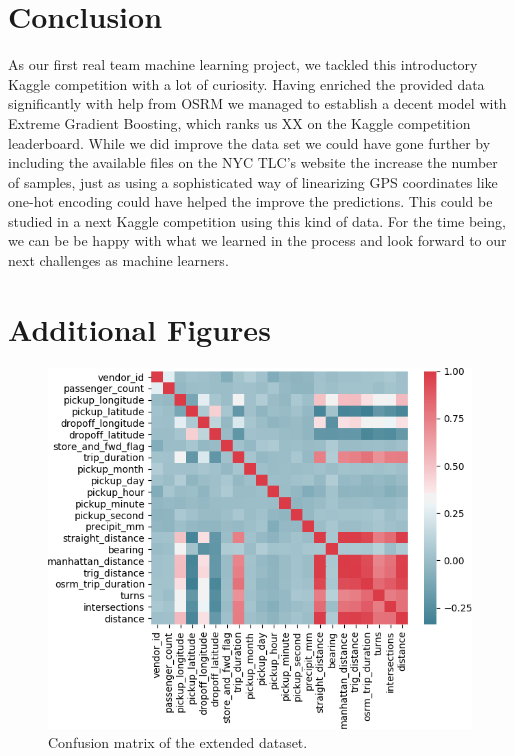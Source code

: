 \documentclass[a4paper]{article}
\begin{document}
\section{Conclusion}
As our first real team machine learning project, we tackled this introductory
Kaggle competition with a lot of curiosity. Having enriched the provided data
significantly with help from OSRM we managed to establish a decent model with
Extreme Gradient Boosting, which ranks us XX on the Kaggle competition
leaderboard. While we did improve the data set we could have gone further by
including the available files on the NYC TLC’s website the increase the number
of samples, just as using a sophisticated way of linearizing GPS coordinates
like one-hot encoding could have helped the improve the predictions. This could
be studied in a next Kaggle competition using this kind of data. For the time
being, we can be be happy with what we learned in the process and look forward
to our next challenges as machine learners.

\newpage
\footnotesize



\appendix
\newpage
\section{Additional Figures}
\begin{figure}[h!]
    \centering
    \includegraphics[width=0.8\linewidth]{confusion}
    \caption{Confusion matrix of the extended dataset.}
    \label{confusion}
\end{figure}
\end{document}
